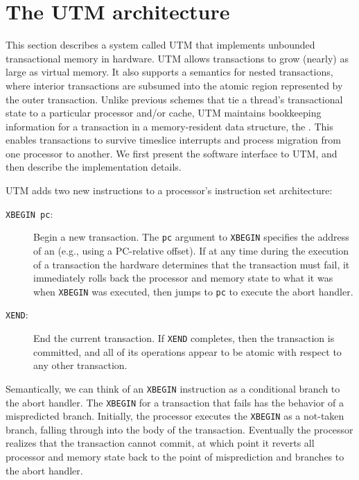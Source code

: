\section{The UTM architecture}\label{sec:utm}

This section describes a system called UTM that implements
unbounded transactional memory in hardware.  UTM allows
transactions to grow (nearly) as large as virtual memory.  It also
supports a semantics for nested transactions, where interior
transactions are subsumed into the atomic region represented by the
outer transaction.  Unlike previous schemes that tie a thread's
transactional state to a particular processor and/or cache, UTM
maintains bookkeeping information for a transaction in a
memory-resident data structure, the .  This
enables transactions to survive timeslice interrupts and process
migration from one processor to another.  We first present the
software interface to UTM, and then describe the implementation
details.


UTM adds two new instructions to a processor's instruction set
architecture:
\begin{description}
\item[\texttt{XBEGIN pc}:] Begin a new transaction.  The
\texttt{pc} argument to \texttt{XBEGIN} specifies
the address of an  (e.g., using a PC-relative offset).
If at any time during the execution of a transaction the hardware determines
that the transaction must fail, it immediately rolls back the
processor and memory state to what it was when \texttt{XBEGIN} was
executed, then jumps to \texttt{pc} to execute the abort handler.
 
\item[\texttt{XEND}:] End the current transaction.  If \texttt{XEND}
completes, then the transaction is committed, and all of its
operations appear to be atomic with respect to any other transaction.
\end{description}

Semantically, we can think of an \texttt{XBEGIN} instruction as a
conditional branch to the abort handler.  The \texttt{XBEGIN} for a
transaction that fails has the behavior of a mispredicted branch.
Initially, the processor executes the \texttt{XBEGIN} as a not-taken
branch, falling through into the body of the transaction.  Eventually
the processor realizes that the transaction cannot commit, at which
point it reverts all processor and memory state back to the point of
misprediction and branches to the abort handler.


